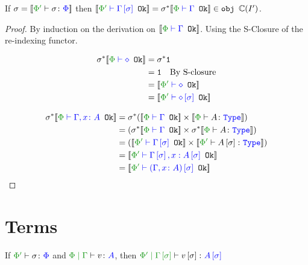 \documentclass{report}
\begin{document}
\begin{theorem}
    If $\si = \deno{\typerelation{\P'}{\si}{\P}}$ then $\deno{\wellformedok{\P'}{\G\ssi}} = \si\star\deno{\wellformedok{\P}{\G}}\in\obj\C(I')$.
\end{theorem}

\begin{framed}
    \begin{proof}
        By induction on the derivation on $\deno{\wellformedok{\P}{\G}}$. Using the S-Closure of the re-indexing functor.
        
        \begin{align*}
            \si\star\deno{\wellformedok{\P}{\nil}} &=\si\star\1\\
            & = \1\qt{By S-closure}\\
            &= \deno{\wellformedok{\P'}{\nil}}\\
            &= \deno{\wellformedok{\P'}{\nil\ssi}}\\
        \end{align*}
        
        \begin{align*}
           \si\star\deno{\wellformedok{\P}{\gax}} &= \si\star(\deno{\wellformedok{\P}{\G}} \times \deno{\typerelation{\P}{A}{\type}}) \\
           & = (\si\star\deno{\wellformedok{\P}{\G}} \times \si\star\deno{\typerelation{\P}{A}{\type}})\\
            & = (\deno{\wellformedok{\P'}{\G\ssi}} \times \deno{\typerelation{\P'}{A\ssi}{\type}})\\
            & = \deno{\wellformedok{\P'}{\G\ssi, x: A\ssi}}\\
            & = \deno{\wellformedok{\P'}{(\gax)\ssi}}\\
        \end{align*}
    \end{proof}
\end{framed}



\section{Terms}
\begin{theorem}
    If $\typerelation{\P'}{\si}{\P}$ and $\gpetyperelation{v}{A}$, then $\etyperelation{\P'}{\G\ssi}{v\ssi}{A\ssi}$ 
\end{theorem}
\end{document}
